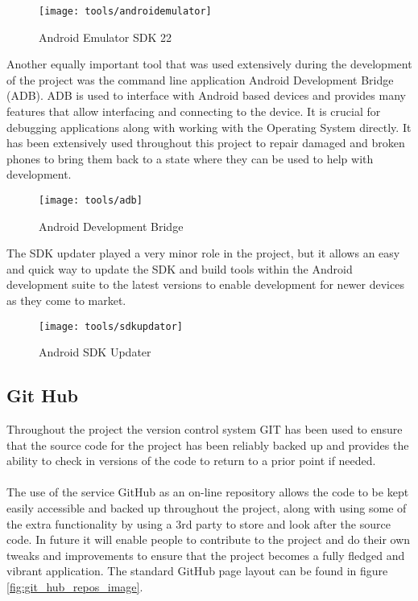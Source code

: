 \begin{figure}[H]
    \centering
    \texttt{[image: tools/androidemulator]}
    \caption{Android Emulator SDK 22}
    \label{fig:android_emulator}
\end{figure} 

\label{sec:adb}
\noindent
Another equally important tool that was used extensively during the development of the project was the command line application Android Development Bridge (ADB). ADB is used to interface with Android based devices and provides many features that allow interfacing and connecting to the device. It is crucial for debugging applications along with working with the Operating System directly. It has been extensively used throughout this project to repair damaged and broken phones to bring them back to a state where they can be used to help with development.

\begin{figure}[H]
    \centering
    \texttt{[image: tools/adb]}
    \caption{Android Development Bridge}
    \label{fig:adb_image}
\end{figure} 

\noindent
The SDK updater played a very minor role in the project, but it allows an easy and quick way to update the SDK and build tools within the Android development suite to the latest versions to enable development for newer devices as they come to market.

\begin{figure}[H]
    \centering
    \texttt{[image: tools/sdkupdator]}
    \caption{Android SDK Updater}
    \label{fig:sdk_updator}
\end{figure} 

\subsection{Git Hub}

Throughout the project the version control system GIT has been used to ensure that the source code for the project has been reliably backed up and provides the ability to check in versions of the code to return to a prior point if needed.\\
\\
The use of the service GitHub as an on-line repository allows the code to be kept easily accessible and backed up throughout the project, along with using some of the extra functionality by using a 3rd party to store and look after the source code. In future it will enable people to contribute to the project and do their own tweaks and improvements to ensure that the project becomes a fully fledged and vibrant application. The standard GitHub page layout can be found in figure \ref{fig:git_hub_repos_image}.

